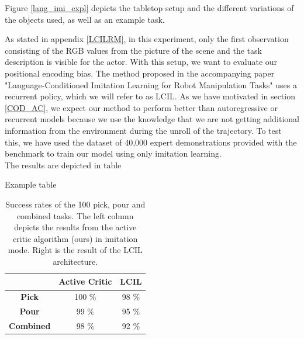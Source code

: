 Figure \ref{lang_imi_expl} depicts the tabletop setup and the different variations of the objects used, as well as an example task.

As stated in appendix \ref{LCILRM}, in this experiment, only the first observation consisting of the RGB values from the picture of the 
scene and the task description is visible for the actor. With this setup, we want to evaluate our positional encoding bias. The method 
proposed in the accompanying paper "Language-Conditioned Imitation Learning for Robot Manipulation Tasks" uses a recurrent policy, which 
we will refer to as LCIL. As we have motivated in section \ref{COD_AC}, we expect our method to perform better than autoregressive or recurrent 
models because we use the knowledge that we are not getting additional information from the environment during the unroll of the trajectory. 
To test this, we have used the dataset of 40,000 expert demonstrations provided with the benchmark to train our model using only imitation learning.\\

The results are depicted in table

\begin{table}
    \centering
    \caption{Example table}
    \begin{tabular}{|c|c|c|}
        \cline{2-3}
        \multicolumn{1}{c|}{} & \textbf{Active Critic} & \textbf{LCIL} \\ \hline
        \textbf{Pick} & 100 \% & 98 \% \\ \hline
        \textbf{Pour} & 99 \% & 95 \% \\ \hline
        \textbf{Combined} & 98 \% & 92 \% \\ \hline
    \end{tabular}
    \caption{Success rates of the 100 pick, pour and combined tasks. The left column depicts the results from the active critic algorithm (ours) in 
    imitation mode. Right is the result of the LCIL architecture.}
\end{table}

